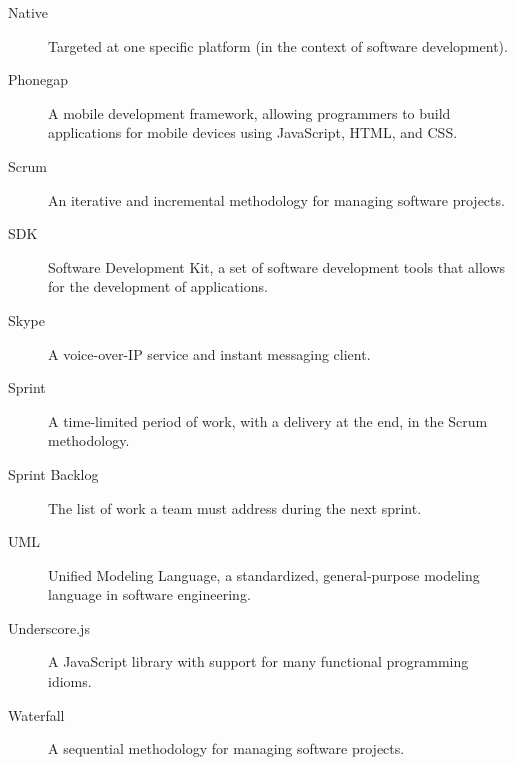 \begin{description}
   \item[Native] Targeted at one specific platform (in the context of software development).
   \item[Phonegap] A mobile development framework, allowing programmers to build applications for mobile devices using JavaScript, HTML, and CSS.
   \item[Scrum] An iterative and incremental methodology for managing software projects.
   \item[SDK] Software Development Kit, a set of software development tools that allows for the development of applications.
   \item[Skype] A voice-over-IP service and instant messaging client.
   \item[Sprint] A time-limited period of work, with a delivery at the end, in the Scrum methodology.
   \item[Sprint Backlog] The list of work a team must address during the next sprint.
   \item[UML] Unified Modeling Language, a standardized, general-purpose modeling language in software engineering.
   \item[Underscore.js] A JavaScript library with support for many functional programming idioms.
   \item[Waterfall] A sequential methodology for managing software projects.
\end{description}
